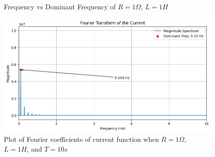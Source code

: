\begin{multicols}{2}
\begin{figure}[H]
  \caption{Frequency vs Dominant Frequency of $R=1\Omega$, $L=1H$}
\end{figure}
\begin{figure}[H]
  \centering
  \includegraphics[width=\columnwidth]{sections/fourier_transform.png}
  \caption{Plot of Fourier coefficients of current function when $R=1\Omega$, $L=1H$, and $T=10s$}
\end{figure}
\end{multicols}
